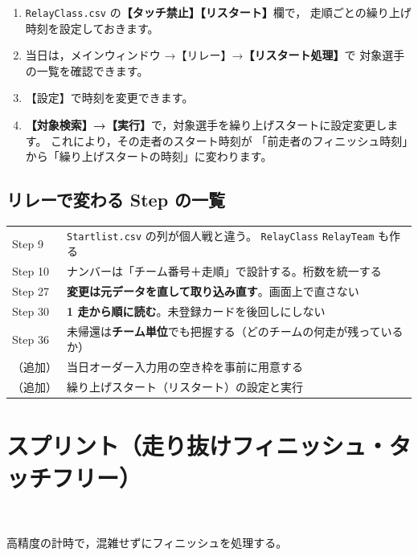 \begin{enumerate}
\item \texttt{RelayClass.csv} の\textbf{【タッチ禁止】【リスタート】}欄で，
      走順ごとの繰り上げ時刻を設定しておきます。
\item 当日は，メインウィンドウ →【リレー】→\textbf{【リスタート処理】}で
      対象選手の一覧を確認できます。\ver
\item 【設定】で時刻を変更できます。
\item \textbf{【対象検索】→【実行】}で，対象選手を繰り上げスタートに設定変更します。
      これにより，その走者のスタート時刻が
      「前走者のフィニッシュ時刻」から「繰り上げスタートの時刻」に変わります。
\end{enumerate}

\subsection*{リレーで変わる Step の一覧}

\begin{center}
\small
\begin{tabular}{@{}P{22mm}P{122mm}@{}}
\toprule
{} &  \\
\midrule
Step 9 & \texttt{Startlist.csv} の列が個人戦と違う。
  \texttt{RelayClass} \texttt{RelayTeam} も作る \\
Step 10 & ナンバーは「チーム番号＋走順」で設計する。桁数を統一する \\
Step 27 & \textbf{変更は元データを直して取り込み直す}。画面上で直さない \\
Step 30 & \textbf{1 走から順に読む}。未登録カードを後回しにしない \\
Step 36 & 未帰還は\textbf{チーム単位}でも把握する（どのチームの何走が残っているか） \\
（追加） & 当日オーダー入力用の空き枠を事前に用意する \\
（追加） & 繰り上げスタート（リスタート）の設定と実行 \\
\bottomrule
\end{tabular}
\end{center}

\section{スプリント（走り抜けフィニッシュ・タッチフリー）}
\tSIAC\ \tSI

\begin{GoalC}
高精度の計時で，混雑せずにフィニッシュを処理する。
\end{GoalC}

